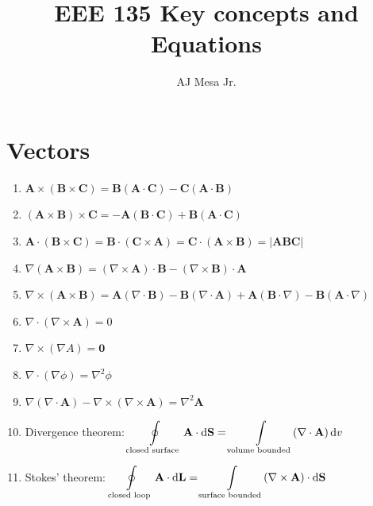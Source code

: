 \documentclass[a4paper,11pt]{article}
\title{\textbf{EEE 135 Key concepts and Equations}}
\author{AJ Mesa Jr.}
\newcommand*\dd{\mathop{}\!\mathrm{d}}
\newcommand{\grad}{\nabla}
\newcommand{\divr}{\nabla \cdot}
\newcommand{\curl}{\nabla \times}
\newcommand{\bvec}[1]{\mathbf{#1}}
\begin{document}
	\maketitle	
	\tableofcontents 
	
	\section*{Vectors}
		\begin{enumerate}
			\item $\bvec{A} \times (\bvec{B} \times \bvec{C}) = \bvec{B}(\bvec{A} \cdot \bvec{C}) - \bvec{C}(\bvec{A} \cdot \bvec{B} )$
			\item $(\bvec{A} \times \bvec{B}) \times \bvec{C} = -\bvec{A}(\bvec{B} \cdot \bvec{C}) + \bvec{B}(\bvec{A} \cdot \bvec{C} )$
			\item $\bvec{A} \cdot (\bvec{B} \times \bvec{C}) = \bvec{B} \cdot (\bvec{C} \times \bvec{A}) = \bvec{C} \cdot (\bvec{A} \times \bvec{B}) = \left| \bvec{A}\bvec{B}\bvec{C} \right|$
			\item $\grad(\bvec{A} \times \bvec{B}) = (\grad \times \bvec{A})\cdot\bvec{B} - (\grad \times \bvec{B})\cdot\bvec{A}$
			\item $\grad\times (\bvec{A} \times \bvec{B}) = \bvec{A}(\divr\bvec{B}) - \bvec{B}(\divr\bvec{A}) + \bvec{A}(\bvec{B}\cdot\grad) - \bvec{B}(\bvec{A}\cdot\grad)$
			\item $\divr(\curl\bvec{A}) = 0$ 
			\item $\curl(\grad A) = \bvec{0}$
			\item $\divr(\grad\phi) = \grad^2\phi$
			\item $\grad(\divr\bvec{A}) - \curl(\curl\bvec{A}) = \grad^2 \bvec{A}$
			\item Divergence theorem: $\displaystyle \oint\displaylimits_\text{closed surface} \bvec{A} \cdot \dd \bvec{S} = \int\displaylimits_\text{volume bounded} (\divr\bvec{A}) \dd v$
			\item Stokes' theorem: $\displaystyle \oint\displaylimits_\text{closed loop} \bvec{A} \cdot \dd \bvec{L} = \int\displaylimits_\text{surface bounded} (\curl\bvec{A}) \cdot \dd \bvec{S} $
		\end{enumerate}
	\newpage
\end{document}
